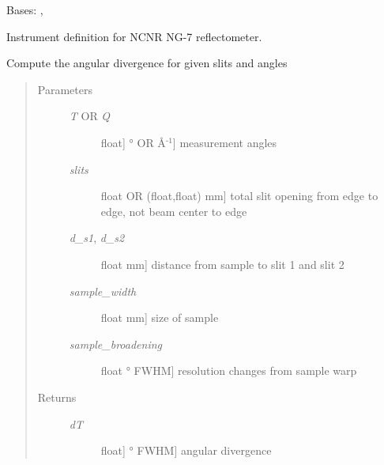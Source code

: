 \documentclass[letterpaper,10pt,english]{sphinxmanual}
\begin{document}
\begin{fulllineitems}
\label{api/ncnrdata:refl1d.ncnrdata.NG7}
Bases: {\hyperref[api/ncnrdata:refl1d.ncnrdata.NCNRData]{}}, {\hyperref[api/instrument:refl1d.instrument.Monochromatic]{}}

Instrument definition for NCNR NG-7 reflectometer.

\begin{fulllineitems}
\label{api/ncnrdata:refl1d.ncnrdata.NG7.calc_dT}
Compute the angular divergence for given slits and angles
\begin{quote}\begin{description}
\item[{Parameters }] \leavevmode\begin{description}
\item[{\emph{T} OR \emph{Q}}] \leavevmode{[}{[}float{]} \textbar{} ° OR Å$^{\text{-1}}${]}
measurement angles

\item[{\emph{slits}}] \leavevmode{[}float OR (float,float) \textbar{} mm{]}
total slit opening from edge to edge, not beam center to edge

\item[{\emph{d\_s1}, \emph{d\_s2}}] \leavevmode{[}float \textbar{} mm{]}
distance from sample to slit 1 and slit 2

\item[{\emph{sample\_width}}] \leavevmode{[}float \textbar{} mm{]}
size of sample

\item[{\emph{sample\_broadening}}] \leavevmode{[}float \textbar{} ° FWHM{]}
resolution changes from sample warp

\end{description}

\item[{Returns }] \leavevmode\begin{description}
\item[{\emph{dT}}] \leavevmode{[}{[}float{]} \textbar{} ° FWHM{]}
angular divergence

\end{description}

\end{description}\end{quote}


\end{fulllineitems}
\end{fulllineitems}
\end{document}
